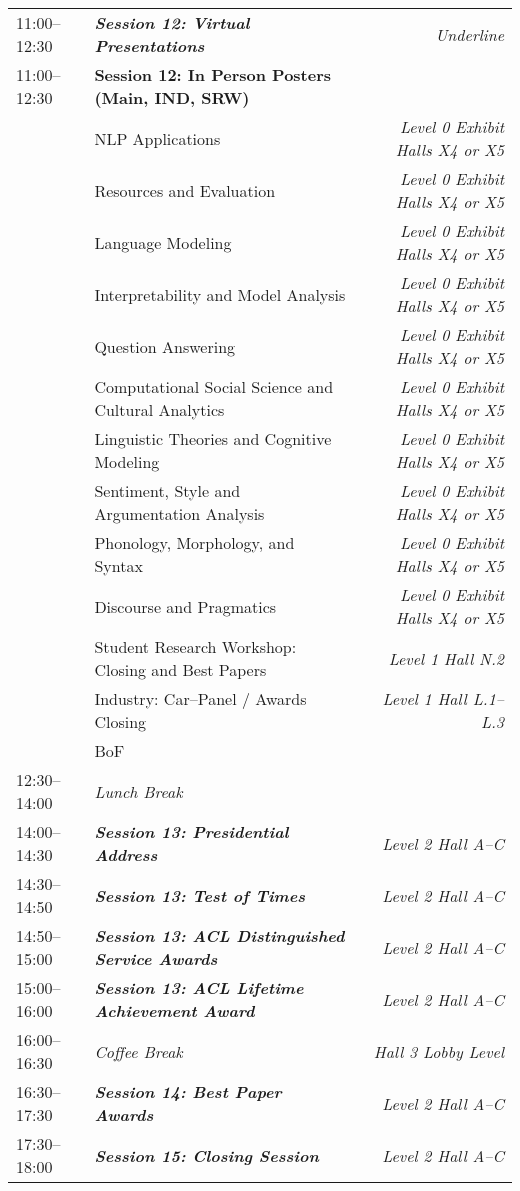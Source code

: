 \begin{xltabular}{\linewidth}{l X r}
    11:00--12:30    &   \textit{\textbf{Session 12: Virtual Presentations}}    & \textit{Underline}  \\
    11:00--12:30    &   \textbf{Session 12: In Person Posters (Main, IND, SRW)} & \\
    &   NLP Applications  & \textit{Level 0 Exhibit Halls X4 or X5} \\
    &   Resources and Evaluation  & \textit{Level 0 Exhibit Halls X4 or X5} \\
    &   Language Modeling  & \textit{Level 0 Exhibit Halls X4 or X5} \\
    &   Interpretability and Model Analysis   & \textit{Level 0 Exhibit Halls X4 or X5} \\
    &   Question Answering  & \textit{Level 0 Exhibit Halls X4 or X5} \\
    &   Computational Social Science and Cultural Analytics   & \textit{Level 0 Exhibit Halls X4 or X5} \\
    &   Linguistic Theories and Cognitive Modeling & \textit{Level 0 Exhibit Halls X4 or X5} \\
    &   Sentiment, Style and Argumentation Analysis   & \textit{Level 0 Exhibit Halls X4 or X5} \\
    &   Phonology, Morphology, and Syntax   & \textit{Level 0 Exhibit Halls X4 or X5} \\
    &   Discourse and Pragmatics   & \textit{Level 0 Exhibit Halls X4 or X5} \\
    &   Student Research Workshop: Closing and Best Papers  & \textit{Level 1 Hall N.2} \\
    &   Industry: Car--Panel / Awards Closing  & \textit{Level 1 Hall L.1--L.3} \\
    &   BoF  & \\

    12:30--14:00    &   \textit{Lunch Break}  & \\

    14:00--14:30    &   \textit{\textbf{Session 13: Presidential Address}}  & \textit{Level 2 Hall A--C}\\
    14:30--14:50    &   \textit{\textbf{Session 13: Test of Times}}  & \textit{Level 2 Hall A--C}\\
    14:50--15:00    &   \textit{\textbf{Session 13: ACL Distinguished Service Awards}}  & \textit{Level 2 Hall A--C}\\
    15:00--16:00    &   \textit{\textbf{Session 13: ACL Lifetime Achievement Award}}  & \textit{Level 2 Hall A--C}\\

    16:00--16:30    &   \textit{Coffee Break}    & \textit{Hall 3 Lobby Level }  \\

    16:30--17:30    &   \textit{\textbf{Session 14: Best Paper Awards}}  & \textit{Level 2 Hall A--C}\\
    
    17:30--18:00    &   \textit{\textbf{Session 15: Closing Session}}  & \textit{Level 2 Hall A--C}\\


\end{xltabular}

\clearpage




\endgroup
